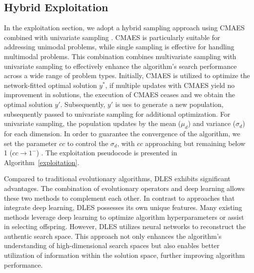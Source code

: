 \documentclass[journal,twoside]{IEEEtran}
\begin{document}
\subsection{Hybrid Exploitation}
In the exploitation section, we adopt a hybrid sampling approach using CMAES combined with univariate sampling \cite{8790358}. CMAES is particularly suitable for addressing unimodal problems, while single sampling is effective for handling multimodal problems. This combination combines multivariate sampling with univariate sampling to effectively enhance the algorithm's search performance across a wide range of problem types. Initially, CMAES is utilized to optimize the network-fitted optimal solution $y^{*}$, if multiple updates with CMAES yield no improvement in solutions, the execution of CMAES ceases and we obtain the optimal solution $y'$. Subsequently, $y'$ is ues to generate a new population, subsequently passed to univariate sampling for additional optimization. For univariate sampling, the population updates by the mean ($\mu_{d}$) and variance ($\sigma_{d}$) for each dimension. In order to guarantee the convergence of the algorithm, we set the parameter $cc$ to control the $\sigma_{d}$, with $cc$ approaching but remaining below 1 ($cc \rightarrow 1^{-}$) \cite{zhang2018hybrid}. The exploitation pseudocode is presented in Algorithm~\ref{exploitation}.

Compared to traditional evolutionary algorithms, DLES exhibits significant advantages. The combination of evolutionary operators and deep learning allows these two methods to complement each other. In contrast to approaches that integrate deep learning, DLES possesses its own unique features. Many existing methods leverage deep learning to optimize algorithm hyperparameters or assist in selecting offspring. However, DLES utilizes neural networks to reconstruct the authentic search space. This approach not only enhances the algorithm's understanding of high-dimensional search spaces but also enables better utilization of information within the solution space, further improving algorithm performance.
\end{document}
